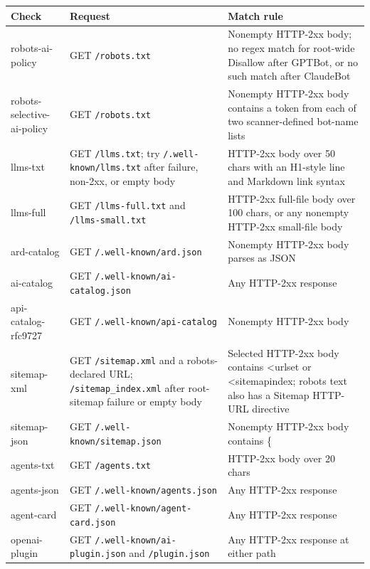 \documentclass{article}
\begin{document}
\begingroup
\footnotesize
\setlength{\tabcolsep}{3pt}
\setlength{\LTleft}{0pt}
\setlength{\LTright}{0pt plus 1fill}
\begin{longtable}{>{\raggedright\arraybackslash}p{}>{\raggedright\arraybackslash}p{}>{\raggedright\arraybackslash}p{}}
\toprule
\textbf{Check} & \textbf{Request} & \textbf{Match rule} \\
\midrule
\endhead
robots-ai-policy & GET \nolinkurl{/robots.txt} & Nonempty HTTP-2xx body; no regex match for root-wide Disallow after GPTBot, or no such match after ClaudeBot \\
robots-selective-ai-policy & GET \nolinkurl{/robots.txt} & Nonempty HTTP-2xx body contains a token from each of two scanner-defined bot-name lists \\
llms-txt & GET \nolinkurl{/llms.txt}; try \nolinkurl{/.well-known/llms.txt} after failure, non-2xx, or empty body & HTTP-2xx body over 50 chars with an H1-style line and Markdown link syntax \\
llms-full & GET \nolinkurl{/llms-full.txt} and \nolinkurl{/llms-small.txt} & HTTP-2xx full-file body over 100 chars, or any nonempty HTTP-2xx small-file body \\
ard-catalog & GET \nolinkurl{/.well-known/ard.json} & Nonempty HTTP-2xx body parses as JSON \\
ai-catalog & GET \nolinkurl{/.well-known/ai-catalog.json} & Any HTTP-2xx response \\
api-catalog-rfc9727 & GET \nolinkurl{/.well-known/api-catalog} & Nonempty HTTP-2xx body \\
sitemap-xml & GET \nolinkurl{/sitemap.xml} and a robots-declared URL; \nolinkurl{/sitemap_index.xml} after root-sitemap failure or empty body & Selected HTTP-2xx body contains <urlset or <sitemapindex; robots text also has a Sitemap HTTP-URL directive \\
sitemap-json & GET \nolinkurl{/.well-known/sitemap.json} & Nonempty HTTP-2xx body contains \{ \\
agents-txt & GET \nolinkurl{/agents.txt} & HTTP-2xx body over 20 chars \\
agents-json & GET \nolinkurl{/.well-known/agents.json} & Any HTTP-2xx response \\
agent-card & GET \nolinkurl{/.well-known/agent-card.json} & Any HTTP-2xx response \cite{ref9} \\
openai-plugin & GET \nolinkurl{/.well-known/ai-plugin.json} and \nolinkurl{/plugin.json} & Any HTTP-2xx response at either path \\
\bottomrule
\end{longtable}
\endgroup
\end{document}
